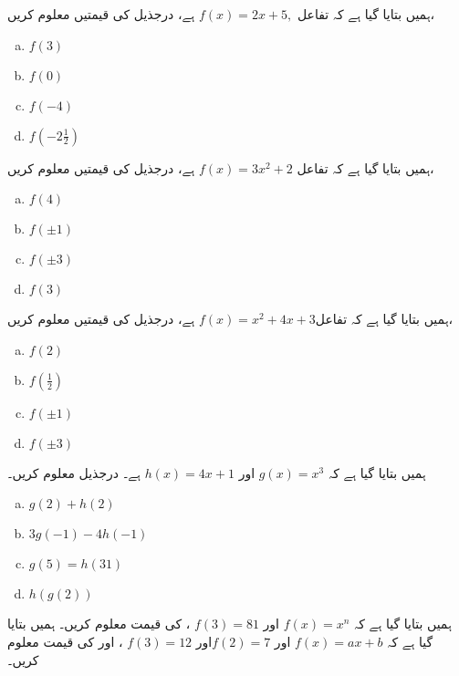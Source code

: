ہمیں بتایا گیا ہے کہ تفاعل \(f(x)=2x+5,\) ہے، درجذیل کی قیمتیں معلوم کریں،
\begin{multicols}{2}
\begin{enumerate}[a.]
\item \( f(3) \)
\item \( f(0) \)
\item \(  f(-4)\)
\item \(f(-2\frac{1}{2})  \)
 \end{enumerate}
\end{multicols}
 ہمیں بتایا گیا ہے کہ تفاعل \(f(x)=3x^{2}+2\) ہے، درجذیل کی قیمتیں معلوم کریں،
\begin{multicols}{2}
\begin{enumerate}[a.]
\item \( f(4) \)
\item \( f(\pm 1) \)
\item \(  f(\pm 3) \)
\item \(f(3)  \)
\end{enumerate}
\end{multicols}
 ہمیں بتایا گیا ہے کہ تفاعل\(f(x)=x^{2}+4x+3\) ہے، درجذیل کی قیمتیں معلوم کریں،
\begin{multicols}{2}
\begin{enumerate}[a.]
\item \( f(2) \)
\item \( f(\frac{1}{2}) \)
\item \( f(\pm 1) \)
\item \(f(\pm 3)  \)
\end{enumerate}
\end{multicols}
ہمیں بتایا گیا ہے کہ \(   g(x)=x^{3} \) اور \(   h(x)=4x+1 \) ہے۔ درجذیل معلوم کریں۔
\begin{multicols}{2}
\begin{enumerate}[a.]
\item \( g(2)+h(2)  \)
\item \(3g(-1)-4h(-1)   \)
\item \(g(5)=h(31)  \)
\item \( h(g(2))  \)
\end{enumerate}
\end{multicols}
ہمیں بتایا گیا ہے کہ \(f(x)=x^{n}\) اور \(f(3)=81\) ،  کی قیمت معلوم کریں۔
ہمیں بتایا گیا ہے کہ \(f(x)=ax+b\) اور \(f(2)=7\)اور \(f(3)=12\) ، اور  کی قیمت معلوم کریں۔
